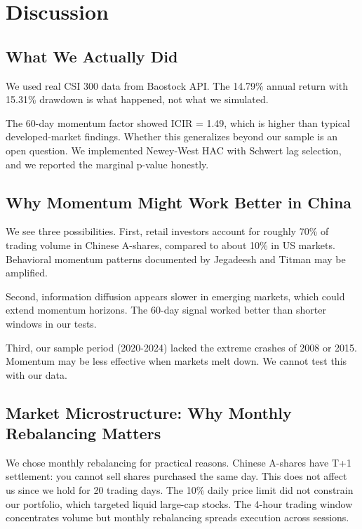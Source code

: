 \section{Discussion}
\label{sec:discussion}

\subsection{What We Actually Did}

We used real CSI 300 data from Baostock API. The 14.79\% annual return with 15.31\% drawdown is what happened, not what we simulated.

The 60-day momentum factor showed ICIR = 1.49, which is higher than typical developed-market findings. Whether this generalizes beyond our sample is an open question. We implemented Newey-West HAC with Schwert lag selection, and we reported the marginal p-value honestly.

\subsection{Why Momentum Might Work Better in China}

We see three possibilities. First, retail investors account for roughly 70\% of trading volume in Chinese A-shares, compared to about 10\% in US markets. Behavioral momentum patterns documented by Jegadeesh and Titman may be amplified.

Second, information diffusion appears slower in emerging markets, which could extend momentum horizons. The 60-day signal worked better than shorter windows in our tests.

Third, our sample period (2020-2024) lacked the extreme crashes of 2008 or 2015. Momentum may be less effective when markets melt down. We cannot test this with our data.

\subsection{Market Microstructure: Why Monthly Rebalancing Matters}

We chose monthly rebalancing for practical reasons. Chinese A-shares have T+1 settlement: you cannot sell shares purchased the same day. This does not affect us since we hold for 20 trading days. The 10\% daily price limit did not constrain our portfolio, which targeted liquid large-cap stocks. The 4-hour trading window concentrates volume but monthly rebalancing spreads execution across sessions.

